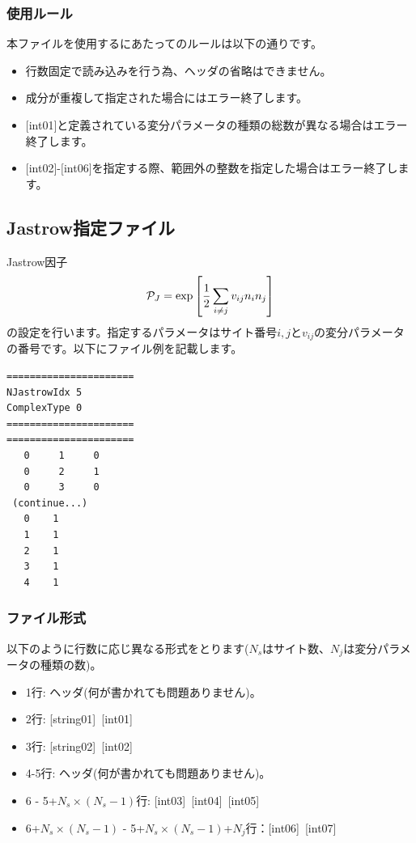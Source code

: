\subsubsection{使用ルール}
本ファイルを使用するにあたってのルールは以下の通りです。
\begin{itemize}
\item 行数固定で読み込みを行う為、ヘッダの省略はできません。
\item 成分が重複して指定された場合にはエラー終了します。
\item $[$int01$]$と定義されている変分パラメータの種類の総数が異なる場合はエラー終了します。
\item $[$int02$]$-$[$int06$]$を指定する際、範囲外の整数を指定した場合はエラー終了します。
\end{itemize}

\newpage
\subsection{Jastrow指定ファイル}
\label{Subsec:Jastrow}
Jastrow因子
\begin{equation}
{\cal P}_J=\exp\left[\frac{1}{2} \sum_{i\neq j} v_{ij} n_i n_j\right]
\end{equation}
の設定を行います。指定するパラメータはサイト番号$i, j$と$v_{ij}$の変分パラメータの番号です。以下にファイル例を記載します。

\begin{minipage}{12.5cm}
\begin{screen}
\begin{verbatim}
======================
NJastrowIdx 5  
ComplexType 0
====================== 
======================
   0     1     0 
   0     2     1 
   0     3     0 
 (continue...)
   0    1 
   1    1 
   2    1 
   3    1 
   4    1 
\end{verbatim}
\end{screen}
\end{minipage}

\subsubsection{ファイル形式}
以下のように行数に応じ異なる形式をとります($N_s$はサイト数、$N_j$は変分パラメータの種類の数)。
 \begin{itemize}
   \item  1行:  ヘッダ(何が書かれても問題ありません)。
   \item  2行:   [string01]~[int01]
   \item  3行:   [string02]~[int02]
   \item  4-5行:  ヘッダ(何が書かれても問題ありません)。
   \item  6 - 5+$N_s\times (N_s-1)$行: [int03]~[int04]~[int05]
   \item  6+$N_s\times (N_s-1)$ - 5+$N_s\times (N_s-1)$+$N_j$行：[int06]~[int07]
  \end{itemize}
